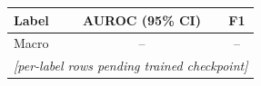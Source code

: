 \begin{tabular}{lcc}
\toprule
Label & AUROC (95\% CI) & F1 \\
\midrule
Macro & -- & -- \\
\multicolumn{3}{c}{\textit{[per-label rows pending trained checkpoint]}} \\
\bottomrule
\end{tabular}
